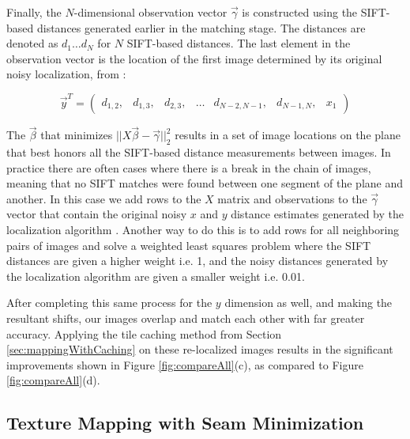\documentclass[10pt,twocolumn,letterpaper]{article}
\begin{document}
Finally, the $N$-dimensional observation vector $\vec{\gamma}$ is
constructed using the SIFT-based distances generated earlier in the
matching stage. The distances are denoted as $d_1 \dots d_N$ for $N$
SIFT-based distances. The last element in the observation vector is
the location of the first image determined by its original noisy
localization, from \cite{chen2010indoor, liu2010indoor}:

\[
\vec{y}^T =
\begin{pmatrix}
  d_{1,2}, &d_{1,3}, &d_{2,3}, &\hdots &d_{N-2,N-1}, &d_{N-1,N}, &x_1
\end{pmatrix}
\]

The $\vec{\beta}$ that minimizes $||X \vec{\beta} -
\vec{\gamma}||_2^2$ results in a set of image locations on the plane
that best honors all the SIFT-based distance measurements between
images. In practice there are often cases where there is a break in
the chain of images, meaning that no SIFT matches were found between
one segment of the plane and another. In this case we add rows to the
$X$ matrix and observations to the $\vec{\gamma}$ vector that contain
the original noisy $x$ and $y$ distance estimates generated by the
localization algorithm \cite{chen2010indoor, liu2010indoor}. Another
way to do this is to add rows for all neighboring pairs of images and
solve a weighted least squares problem where the SIFT distances are
given a higher weight i.e. 1, and the noisy distances generated by the
localization algorithm \cite{chen2010indoor, liu2010indoor} are given
a smaller weight i.e. 0.01.

After completing this same process for the $y$ dimension as well, and
making the resultant shifts, our images overlap and match each other
with far greater accuracy. Applying the tile caching method from
Section \ref{sec:mappingWithCaching} on these re-localized images
results in the significant improvements shown in Figure
\ref{fig:compareAll}(c), as compared to Figure \ref{fig:compareAll}(d).


\subsection{Texture Mapping with Seam Minimization}
\label{sec:seamMinimization}
\end{document}

